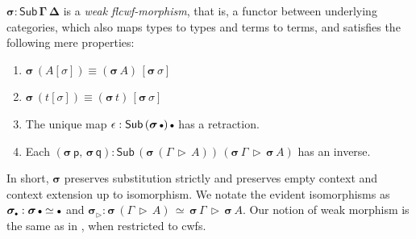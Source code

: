 \documentclass[12pt,a4paper,twoside,openany]{book}
\theoremstyle{remark}
\theoremstyle{definition}
\theoremstyle{theorem}
\newcommand{\bs}[1]{\boldsymbol{#1}}
\newcommand{\Sub}{\mathsf{Sub}}
\newcommand{\ext}{\triangleright}
\newcommand{\emptycon}{\scaleobj{.75}\bullet}
\newcommand{\p}{\mathsf{p}}
\newcommand{\q}{\mathsf{q}}
\newcommand{\bsigma}{\bs{\sigma}}
\begin{document}
$\bs{\sigma : \Sub\,\Gamma\,\Delta}$ is a \emph{weak flcwf-morphism}, that is, a
functor between underlying categories, which also maps types to types and terms
to terms, and satisfies the following mere properties:
  \begin{enumerate}
    \item $\bsigma\,(A[\sigma]) \equiv (\bsigma\,A)\,[\bsigma\,\sigma]$
    \item $\bsigma\,(t[\sigma]) \equiv (\bsigma\,t)\,[\bsigma\,\sigma]$
    \item The unique map $\epsilon : \Sub\,(\bsigma\,\emptycon)\,\emptycon$ has a retraction.
    \item Each $(\bsigma\,\p,\,\bsigma\,\q) : \Sub\,(\bsigma\,(\Gamma\,\ext\,A))\,(\bsigma\,\Gamma\,\ext\,\bsigma\,A)$ has an inverse.
  \end{enumerate}

In short, $\bsigma$ preserves substitution strictly and preserves empty context
and context extension up to isomorphism. We notate the evident isomorphisms as
$\bsigma_{\emptycon} : \bsigma\,\emptycon \simeq \emptycon$ and $\bsigma_{\ext}
: \bsigma\,(\Gamma\,\ext\,A)\,\simeq\,\bsigma\,\Gamma\,\ext\,\bsigma\,A$. Our
notion of weak morphism is the same as in \cite{dependentrightadjoints}, when
restricted to cwfs.
\end{document}
